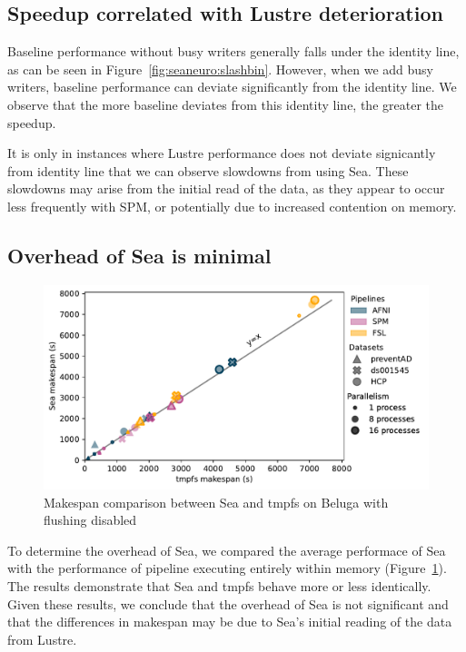 \subsection{Speedup correlated with Lustre deterioration}

Baseline performance without busy writers generally falls under the identity
line, as can be seen in Figure~\ref{fig:seaneuro:slashbin}. However, when we add
busy writers, baseline performance can deviate significantly from the identity
line. We observe that the more baseline deviates from this identity line, the
greater the speedup.

It is only in instances where Lustre performance does not deviate signicantly from
identity line that we can observe slowdowns from using Sea. These slowdowns
may arise from the initial read of the data, as they appear to occur less frequently
with SPM, or potentially due to increased contention on memory.



\subsection{Overhead of Sea is minimal}


\begin{figure}
\centering
\includegraphics[width=\columnwidth]{figures/sea-neuro/beluga_sea_tmpfs.pdf}%
\caption{Makespan comparison between Sea and tmpfs on Beluga with flushing disabled}
\label{fig:seaneuro:tmpfs}
\end{figure}

To determine the overhead of Sea, we compared the average performace of Sea with
the performance of pipeline executing entirely within memory
(Figure~\ref{fig:seaneuro:tmpfs}). The results demonstrate that Sea and tmpfs
behave more or less identically. Given these results, we conclude that the
overhead of Sea is not significant and that the differences in makespan may be
due to Sea's initial reading of the data from Lustre.


